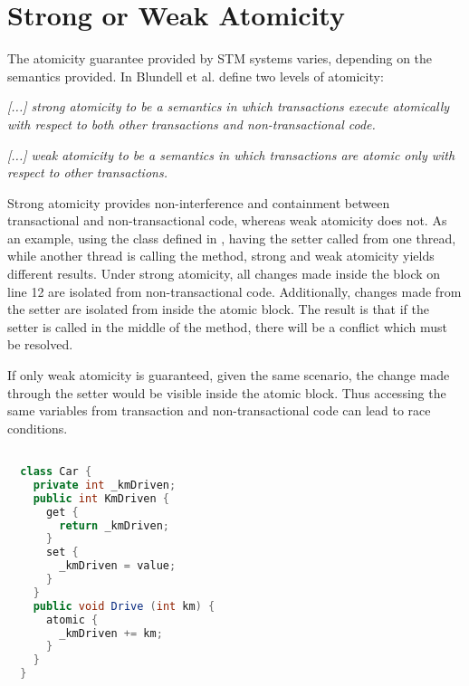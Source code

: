 \section{Strong or Weak Atomicity}
\label{sec:design_strong_weak_atomicity}
The atomicity guarantee provided by \ac{STM} systems varies, depending on the semantics provided. In \cite{blundell2006subtleties} Blundell et al. define two levels of atomicity:
%
\begin{defn}\label{def:strong_atomicity}
\emph{[...] strong atomicity to be a semantics in which transactions execute atomically
with respect to both other transactions and non-transactional code.}
\end{defn}
%
\begin{defn}\label{def:weak_atomicity}
\emph{[...] weak atomicity to be a semantics in which transactions are atomic only with respect to other transactions.}
\end{defn}

Strong atomicity provides non-interference and containment between transactional and non-transactional code, whereas weak atomicity does not. As an example, using the  class defined in , having the  setter called from one thread, while another thread is calling the  method, strong and weak atomicity yields different results. Under strong atomicity, all changes made inside the  block on line 12 are isolated from non-transactional code. Additionally, changes made from the setter are isolated from inside the atomic block. The result is that if the setter is called in the middle of the  method, there will be a conflict which must be resolved. 

If only weak atomicity is guaranteed, given the same scenario, the change made through the setter would be visible inside the atomic block. Thus accessing the same variables from transaction and non-transactional code can lead to race conditions.
%

\begin{lstlisting}[label=lst:atomicity,
  caption={Level of Atomicity},
  language=Java,  
  showspaces=false,
  showtabs=false,
  breaklines=true,
  showstringspaces=false,
  breakatwhitespace=true,
  commentstyle=\color{greencomments},
  keywordstyle=\color{bluekeywords},
  stringstyle=\color{redstrings},
  morekeywords={atomic, retry, orElse, var, get, set}]  % Start your code-block

  class Car {
    private int _kmDriven;
    public int KmDriven {
      get {
        return _kmDriven;
      }
      set {
        _kmDriven = value;
      }
    }
    public void Drive (int km) {
      atomic {
        _kmDriven += km;
      }
    }
  }
\end{lstlisting}

